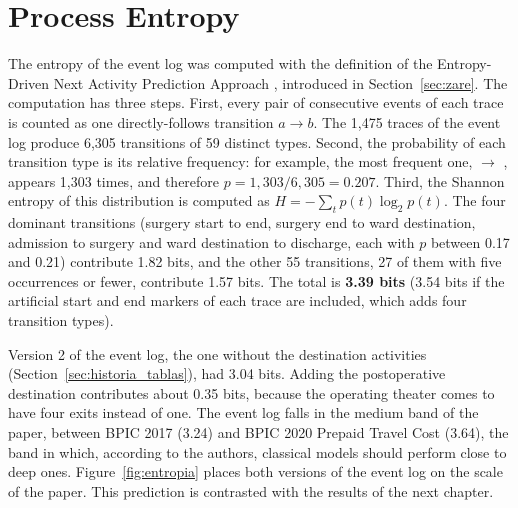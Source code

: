 \section{Process Entropy}
\label{sec:entropia}

The entropy of the event log was computed with the definition of the Entropy-Driven Next Activity Prediction Approach \cite{zare2025}, introduced in Section~\ref{sec:zare}. The computation has three steps. First, every pair of consecutive events of each trace is counted as one directly-follows transition $a \rightarrow b$. The 1,475 traces of the event log produce 6,305 transitions of 59 distinct types. Second, the probability of each transition type is its relative frequency: for example, the most frequent one,  $\rightarrow$ , appears 1,303 times, and therefore $p = 1{,}303 / 6{,}305 = 0.207$. Third, the Shannon entropy of this distribution is computed as $H = -\sum_t p(t)\log_2 p(t)$. The four dominant transitions (surgery start to end, surgery end to ward destination, admission to surgery and ward destination to discharge, each with $p$ between 0.17 and 0.21) contribute 1.82 bits, and the other 55 transitions, 27 of them with five occurrences or fewer, contribute 1.57 bits. The total is \textbf{3.39 bits} (3.54 bits if the artificial start and end markers of each trace are included, which adds four transition types).

Version 2 of the event log, the one without the destination activities (Section~\ref{sec:historia_tablas}), had 3.04 bits. Adding the postoperative destination contributes about 0.35 bits, because the operating theater comes to have four exits instead of one. The event log falls in the medium band of the paper, between BPIC 2017 (3.24) and BPIC 2020 Prepaid Travel Cost (3.64), the band in which, according to the authors, classical models should perform close to deep ones. Figure~\ref{fig:entropia} places both versions of the event log on the scale of the paper. This prediction is contrasted with the results of the next chapter.

